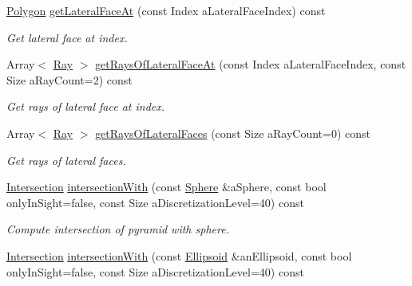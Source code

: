 \begin{DoxyCompactItemize}
\hyperlink{classlibrary_1_1math_1_1geom_1_1d3_1_1objects_1_1_polygon}{Polygon} \hyperlink{classlibrary_1_1math_1_1geom_1_1d3_1_1objects_1_1_pyramid_a36f5527c9708f2d44fdddaf7c9ac5ea0}{get\+Lateral\+Face\+At} (const Index a\+Lateral\+Face\+Index) const
\begin{DoxyCompactList}\small\item\em Get lateral face at index. \end{DoxyCompactList}\item 
Array$<$ \hyperlink{classlibrary_1_1math_1_1geom_1_1d3_1_1objects_1_1_ray}{Ray} $>$ \hyperlink{classlibrary_1_1math_1_1geom_1_1d3_1_1objects_1_1_pyramid_a455aad7bd45e9a180cc8eb0082f9bfcf}{get\+Rays\+Of\+Lateral\+Face\+At} (const Index a\+Lateral\+Face\+Index, const Size a\+Ray\+Count=2) const
\begin{DoxyCompactList}\small\item\em Get rays of lateral face at index. \end{DoxyCompactList}\item 
Array$<$ \hyperlink{classlibrary_1_1math_1_1geom_1_1d3_1_1objects_1_1_ray}{Ray} $>$ \hyperlink{classlibrary_1_1math_1_1geom_1_1d3_1_1objects_1_1_pyramid_ab73146c08e94315b9a7dc2392e450f79}{get\+Rays\+Of\+Lateral\+Faces} (const Size a\+Ray\+Count=0) const
\begin{DoxyCompactList}\small\item\em Get rays of lateral faces. \end{DoxyCompactList}\item 
\hyperlink{classlibrary_1_1math_1_1geom_1_1d3_1_1_intersection}{Intersection} \hyperlink{classlibrary_1_1math_1_1geom_1_1d3_1_1objects_1_1_pyramid_a4f3d9b5270a86b462c33c0b1ddeee873}{intersection\+With} (const \hyperlink{classlibrary_1_1math_1_1geom_1_1d3_1_1objects_1_1_sphere}{Sphere} \&a\+Sphere, const bool only\+In\+Sight=false, const Size a\+Discretization\+Level=40) const
\begin{DoxyCompactList}\small\item\em Compute intersection of pyramid with sphere. \end{DoxyCompactList}\item 
\hyperlink{classlibrary_1_1math_1_1geom_1_1d3_1_1_intersection}{Intersection} \hyperlink{classlibrary_1_1math_1_1geom_1_1d3_1_1objects_1_1_pyramid_a299c41f4cbd61ec24799815dfd7c386d}{intersection\+With} (const \hyperlink{classlibrary_1_1math_1_1geom_1_1d3_1_1objects_1_1_ellipsoid}{Ellipsoid} \&an\+Ellipsoid, const bool only\+In\+Sight=false, const Size a\+Discretization\+Level=40) const

\end{DoxyCompactItemize}
